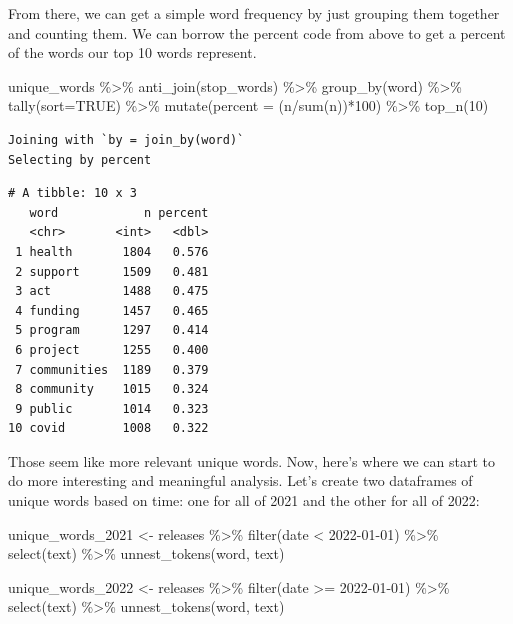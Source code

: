 \documentclass[
  letterpaper,
  DIV=11,
  numbers=noendperiod]{scrreprt}
\newenvironment{Shaded}{\begin{snugshade}}{\end{snugshade}}
\newcommand{\AttributeTok}[1]{\textcolor[rgb]{0.40,0.45,0.13}{#1}}
\newcommand{\ConstantTok}[1]{\textcolor[rgb]{0.56,0.35,0.01}{#1}}
\newcommand{\DecValTok}[1]{\textcolor[rgb]{0.68,0.00,0.00}{#1}}
\newcommand{\FunctionTok}[1]{\textcolor[rgb]{0.28,0.35,0.67}{#1}}
\newcommand{\NormalTok}[1]{\textcolor[rgb]{0.00,0.23,0.31}{#1}}
\newcommand{\OtherTok}[1]{\textcolor[rgb]{0.00,0.23,0.31}{#1}}
\newcommand{\SpecialCharTok}[1]{\textcolor[rgb]{0.37,0.37,0.37}{#1}}
\newcommand{\StringTok}[1]{\textcolor[rgb]{0.13,0.47,0.30}{#1}}
\begin{document}
From there, we can get a simple word frequency by just grouping them
together and counting them. We can borrow the percent code from above to
get a percent of the words our top 10 words represent.

\begin{Shaded}
\begin{Highlighting}[]
\NormalTok{unique\_words }\SpecialCharTok{\%\textgreater{}\%}
  \FunctionTok{anti\_join}\NormalTok{(stop\_words) }\SpecialCharTok{\%\textgreater{}\%}
  \FunctionTok{group\_by}\NormalTok{(word) }\SpecialCharTok{\%\textgreater{}\%}
  \FunctionTok{tally}\NormalTok{(}\AttributeTok{sort=}\ConstantTok{TRUE}\NormalTok{) }\SpecialCharTok{\%\textgreater{}\%}
  \FunctionTok{mutate}\NormalTok{(}\AttributeTok{percent =}\NormalTok{ (n}\SpecialCharTok{/}\FunctionTok{sum}\NormalTok{(n))}\SpecialCharTok{*}\DecValTok{100}\NormalTok{) }\SpecialCharTok{\%\textgreater{}\%}
  \FunctionTok{top\_n}\NormalTok{(}\DecValTok{10}\NormalTok{)}
\end{Highlighting}
\end{Shaded}

\begin{verbatim}
Joining with `by = join_by(word)`
Selecting by percent
\end{verbatim}

\begin{verbatim}
# A tibble: 10 x 3
   word            n percent
   <chr>       <int>   <dbl>
 1 health       1804   0.576
 2 support      1509   0.481
 3 act          1488   0.475
 4 funding      1457   0.465
 5 program      1297   0.414
 6 project      1255   0.400
 7 communities  1189   0.379
 8 community    1015   0.324
 9 public       1014   0.323
10 covid        1008   0.322
\end{verbatim}

Those seem like more relevant unique words. Now, here's where we can
start to do more interesting and meaningful analysis. Let's create two
dataframes of unique words based on time: one for all of 2021 and the
other for all of 2022:

\begin{Shaded}
\begin{Highlighting}[]
\NormalTok{unique\_words\_2021 }\OtherTok{\textless{}{-}}\NormalTok{ releases }\SpecialCharTok{\%\textgreater{}\%}
  \FunctionTok{filter}\NormalTok{(date }\SpecialCharTok{\textless{}} \StringTok{\textquotesingle{}2022{-}01{-}01\textquotesingle{}}\NormalTok{) }\SpecialCharTok{\%\textgreater{}\%}
  \FunctionTok{select}\NormalTok{(text) }\SpecialCharTok{\%\textgreater{}\%}
  \FunctionTok{unnest\_tokens}\NormalTok{(word, text)}

\NormalTok{unique\_words\_2022 }\OtherTok{\textless{}{-}}\NormalTok{ releases }\SpecialCharTok{\%\textgreater{}\%}
  \FunctionTok{filter}\NormalTok{(date }\SpecialCharTok{\textgreater{}=} \StringTok{\textquotesingle{}2022{-}01{-}01\textquotesingle{}}\NormalTok{) }\SpecialCharTok{\%\textgreater{}\%}
  \FunctionTok{select}\NormalTok{(text) }\SpecialCharTok{\%\textgreater{}\%}
  \FunctionTok{unnest\_tokens}\NormalTok{(word, text)}
\end{Highlighting}
\end{Shaded}
\end{document}

